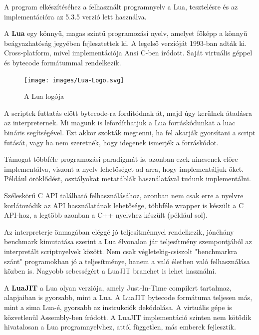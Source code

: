 


A program elkészítéséhez a felhasznált programnyelv a Lua, tesztelésre és az implementációra az 5.3.5 verzió lett használva.

A \textbf{Lua} egy könnyű, magas szintű programozási nyelv, amelyet főképp a könnyű beágyazhatóság jegyében fejlesztettek ki. A legelső verzióját 1993-ban adták ki. Cross-platform, mivel implementációja Ansi C-ben íródott. Saját virtuális géppel és bytecode formátummal rendelkezik.

\begin{figure}[h]
\centering
\texttt{[image: images/Lua-Logo.svg]}
\caption{A Lua logója}
\end{figure}

A scriptek futtatás előtt bytecode-ra fordítódnak át, majd úgy kerülnek átadásra az interpreternek. Mi magunk is lefordíthatjuk a Lua forráskódunkat a luac bináris segítségével.
Ezt akkor szokták megtenni, ha fel akarják gyorsítani a script futását, vagy ha nem szeretnék, hogy idegenek ismerjék a forráskódot.

Támogat többféle programozási paradigmát is, azonban ezek nincsenek előre implementálva, viszont a nyelv lehetőséget ad arra, hogy implementáljuk őket. Például öröklődést, osztályokat metatáblák használatával tudunk implementálni. \cite{ooplua}

Széleskörű C API található felhasználásához, azonban nem csak erre a nyelvre korlátozódik az API használatának lehetősége, többféle wrapper is készült a C API-hoz, a legtöbb azonban a C++ nyelvhez készült (például sol).

Az interpreterje önmagában eléggé jó teljesítménnyel rendelkezik, jónéhány benchmark kimutatása szerint a Lua élvonalon jár teljesítmény szempontjából az interpretált scriptnyelvek között. Nem csak végletekig-csiszolt "benchmarkra szánt" programokban jó a teljesítménye, hanem a való életben való felhasználása közben is. Nagyobb sebességért a LuaJIT branchet is lehet használni.

A \textbf{LuaJIT} a Lua olyan verziója, amely Just-In-Time compilert tartalmaz, alapjaiban is gyorsabb, mint a Lua. A LuaJIT bytecode formátuma teljesen más, mint a sima Lua-é, gyorsabb az instrukciók dekódolása. A virtuális gépe is közvetlenül Assembly-ben íródott. A LuaJIT implementáció szinten nem kötődik hivatalosan a Lua programnyelvhez, attól független, más emberek fejlesztik. \cite {luajit}

